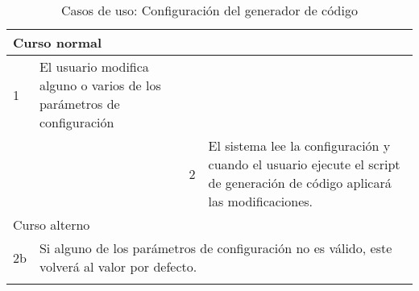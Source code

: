 \begin{center}
\begin{longtable}{ |b{2.5cm}|b{4cm}|b{1cm}|b{2cm}|b{1.5cm}| b{2.5cm}| }
    \hline
    \multicolumn{6}{|l|}{\parbox{8cm}{{\color{RubineRed} Curso normal }}}  \\ 
    \hline
    1 & \multicolumn{2}{|l|}{\parbox{5cm}{ El usuario modifica alguno o varios de los parámetros de configuración}} &  & \multicolumn{2}{|l|}{}\\
    \hline
     & \multicolumn{2}{|l|}{} & 2 &  \multicolumn{2}{|l|}{\parbox{5cm}{El sistema lee la configuración y cuando el usuario ejecute el script de generación de código aplicará las modificaciones.}}\\
    \hline
    \multicolumn{6}{|l|}{\parbox{8cm}{{\color{RubineRed} Curso alterno }}}  \\ 
    \hline
    2b & \multicolumn{5}{|l|}{\parbox{13cm}{Si alguno de los parámetros de configuración no es válido, este volverá al valor por defecto.}}  \\ 
    \hline
    \caption{Casos de uso: Configuración del generador de código}
  	\label{tab:caso-uso:conf}
    \end{longtable}
\end{center}

